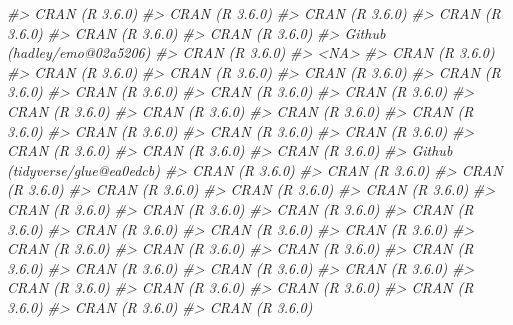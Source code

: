 \documentclass[]{krantz}
\makeatletter
\newenvironment{Shaded}{\begin{snugshade}}{\end{snugshade}}
\newcommand{\CommentTok}[1]{\textcolor[rgb]{0.37,0.37,0.37}{\textit{#1}}}
\newenvironment{kframe}{%
\medskip{}
\setlength{\fboxsep}{.8em}
 \def\at@end@of@kframe{}%
 \ifinner\ifhmode%
  \def\at@end@of@kframe{\end{minipage}}%
  \begin{minipage}{\columnwidth}%
 \fi\fi%
 \def\FrameCommand##1{\hskip\@totalleftmargin \hskip-\fboxsep
 \colorbox{shadecolor}{##1}\hskip-\fboxsep
     \hskip-\linewidth \hskip-\@totalleftmargin \hskip\columnwidth}%
 \MakeFramed {\advance\hsize-\width
   \@totalleftmargin\z@ \linewidth\hsize
   \@setminipage}}%
 {\par\unskip\endMakeFramed%
 \at@end@of@kframe}
\renewenvironment{Shaded}{\begin{kframe}}{\end{kframe}}
\makeatother
\begin{document}
\begin{Shaded}
\begin{Highlighting}[]
\CommentTok{#>  CRAN (R 3.6.0)                 }
\CommentTok{#>  CRAN (R 3.6.0)                 }
\CommentTok{#>  CRAN (R 3.6.0)                 }
\CommentTok{#>  CRAN (R 3.6.0)                 }
\CommentTok{#>  CRAN (R 3.6.0)                 }
\CommentTok{#>  CRAN (R 3.6.0)                 }
\CommentTok{#>  Github (hadley/emo@02a5206)    }
\CommentTok{#>  CRAN (R 3.6.0)                 }
\CommentTok{#>  <NA>                           }
\CommentTok{#>  CRAN (R 3.6.0)                 }
\CommentTok{#>  CRAN (R 3.6.0)                 }
\CommentTok{#>  CRAN (R 3.6.0)                 }
\CommentTok{#>  CRAN (R 3.6.0)                 }
\CommentTok{#>  CRAN (R 3.6.0)                 }
\CommentTok{#>  CRAN (R 3.6.0)                 }
\CommentTok{#>  CRAN (R 3.6.0)                 }
\CommentTok{#>  CRAN (R 3.6.0)                 }
\CommentTok{#>  CRAN (R 3.6.0)                 }
\CommentTok{#>  CRAN (R 3.6.0)                 }
\CommentTok{#>  CRAN (R 3.6.0)                 }
\CommentTok{#>  CRAN (R 3.6.0)                 }
\CommentTok{#>  CRAN (R 3.6.0)                 }
\CommentTok{#>  CRAN (R 3.6.0)                 }
\CommentTok{#>  CRAN (R 3.6.0)                 }
\CommentTok{#>  CRAN (R 3.6.0)                 }
\CommentTok{#>  CRAN (R 3.6.0)                 }
\CommentTok{#>  CRAN (R 3.6.0)                 }
\CommentTok{#>  Github (tidyverse/glue@ea0edcb)}
\CommentTok{#>  CRAN (R 3.6.0)                 }
\CommentTok{#>  CRAN (R 3.6.0)                 }
\CommentTok{#>  CRAN (R 3.6.0)                 }
\CommentTok{#>  CRAN (R 3.6.0)                 }
\CommentTok{#>  CRAN (R 3.6.0)                 }
\CommentTok{#>  CRAN (R 3.6.0)                 }
\CommentTok{#>  CRAN (R 3.6.0)                 }
\CommentTok{#>  CRAN (R 3.6.0)                 }
\CommentTok{#>  CRAN (R 3.6.0)                 }
\CommentTok{#>  CRAN (R 3.6.0)                 }
\CommentTok{#>  CRAN (R 3.6.0)                 }
\CommentTok{#>  CRAN (R 3.6.0)                 }
\CommentTok{#>  CRAN (R 3.6.0)                 }
\CommentTok{#>  CRAN (R 3.6.0)                 }
\CommentTok{#>  CRAN (R 3.6.0)                 }
\CommentTok{#>  CRAN (R 3.6.0)                 }
\CommentTok{#>  CRAN (R 3.6.0)                 }
\CommentTok{#>  CRAN (R 3.6.0)                 }
\CommentTok{#>  CRAN (R 3.6.0)                 }
\CommentTok{#>  CRAN (R 3.6.0)                 }
\CommentTok{#>  CRAN (R 3.6.0)                 }
\CommentTok{#>  CRAN (R 3.6.0)                 }
\CommentTok{#>  CRAN (R 3.6.0)                 }
\CommentTok{#>  CRAN (R 3.6.0)                 }
\CommentTok{#>  CRAN (R 3.6.0)                 }
\CommentTok{#>  CRAN (R 3.6.0)                 }

\end{Highlighting}
\end{Shaded}
\end{document}
